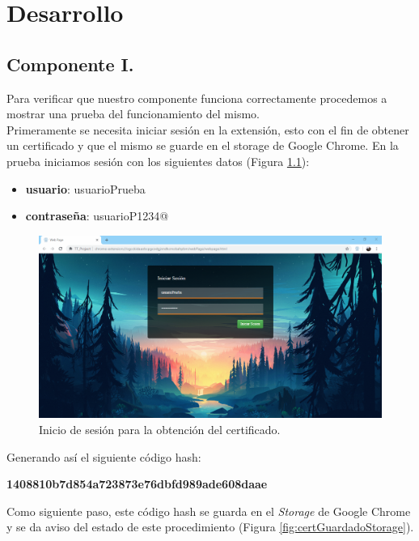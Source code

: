 \documentclass[12pt, a4paper, titlepage]{report}
\begin{document}
	
	
			        
    \chapter{\textcolor{azulescom}{Desarrollo}}
        \section{Componente I.}
            Para verificar que nuestro componente funciona correctamente procedemos a mostrar una prueba del funcionamiento del mismo.\\ Primeramente se necesita iniciar sesión en la extensión, esto con el fin de obtener un certificado y que el mismo se guarde en el storage de Google Chrome. En la prueba iniciamos sesión con los siguientes datos (Figura \ref{fig:InicioDeSesion}): 
    
            \begin{itemize}
                \item \textbf{usuario}: usuarioPrueba
                \item \textbf{contraseña}: usuarioP1234@
            \end{itemize}
    
            \begin{figure}[H]
        		\begin{center}	\includegraphics[width=13cm]{./imagenes/Desarrollo/Componente_1/Version1/inicioSesion_prueba.PNG}
        			\caption{Inicio de sesión para la obtención del certificado.}
        		    \label{fig:InicioDeSesion}
        		\end{center}
        	\end{figure}
        	
	        Generando así el siguiente código hash:
        	\begin{center}
        	   \textbf{1408810b7d854a723873e76dbfd989ade608daae}
        	\end{center}
        	Como siguiente paso, este código hash se guarda en el \textit{Storage} de Google Chrome y se da aviso del estado de este procedimiento (Figura \ref{fig:certGuardadoStorage}).
	
\end{document}
